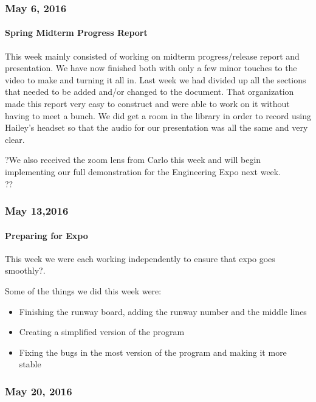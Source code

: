 \subsubsection{May 6, 2016}
\paragraph{Spring Midterm Progress Report}
This week mainly consisted of working on midterm progress/release report and presentation. We have now finished both with only a few minor touches to the video to make and turning it all in. Last week we had divided up all the sections that needed to be added and/or changed to the document. That organization made this report very easy to construct and were able to work on it without having to meet a bunch. We did get a room in the library in order to record using Hailey's headset so that the audio for our presentation was all the same and very clear. 
\par
?We also received the zoom lens from Carlo this week and will begin implementing our full demonstration for the Engineering Expo next week.\\ ??

\subsubsection{May 13,2016}
\paragraph{Preparing for Expo}
This week we were each working independently to ensure that expo goes smoothly?.
\par
Some of the things we did this week were:
\begin{itemize}[leftmargin=2cm,labelindent=2cm]
\item Finishing the runway board, adding the runway number and the middle lines
\item Creating a simplified version of the program
\item Fixing the bugs in the most version of the program and making it more stable\\
\end{itemize}

\subsubsection{May 20, 2016}
